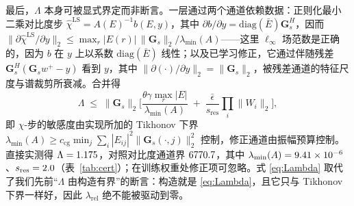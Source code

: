 \documentclass[UTF8,a4paper,11pt]{ctexart}
\newcommand{\norm}[1]{\lVert #1 \rVert}
\newcommand{\numv}[1]{#1}
\begin{document}
最后，$\Lambda$ 本身可被显式界定而非断言。一层通过两个通道依赖数据：正则化最小二乘对比度步
$\hat\chi^{\mathrm{LS}}=A(E)^{-1}b(E,y)$，其中
$\partial b/\partial y=\mathrm{diag}(\bar E)\mathbf{G}_s^{H}$，因而
$\norm{\partial\hat\chi^{\mathrm{LS}}/\partial y}_2
\le\max_r|E(r)|\,\norm{\mathbf{G}_s}_2/\lambda_{\min}(A)$——这里 $\ell_\infty$ 场范数是正确的，因为 $b$ 在 $y$ 上以系数 $\mathrm{diag}(\bar E)$ 线性；以及已学习修正，它通过伴随残差 $\mathbf{G}_s^{H}(\mathbf{G}_s w^{+}-y)$ 看到 $y$，其中 $\norm{\partial(\cdot)/\partial y}_2=\norm{\mathbf{G}_s}_2$，被残差通道的特征尺度与谱裁剪所衰减。合并得
\begin{equation}\label{eq:Lambda}
\Lambda\;\le\;\norm{\mathbf{G}_s}_2
\Big[\frac{\theta\gamma\max_r|E|}{\lambda_{\min}(A)}
\;+\;\frac{\bar\epsilon}{s_{\mathrm{res}}}\prod_i\norm{W_i}_2\Big],
\end{equation}
即 $\chi$-步的敏感度由实现所加的 Tikhonov 下界
$\lambda_{\min}(A)\ge c_{\mathrm{cg}}\min_j\sum_i|E_{ij}|^{2}\norm{\mathbf{G}_s(\cdot,j)}_2^{2}$ 控制，修正通道由振幅预算控制。直接实测得 $\Lambda=\numv{\NumLambdaMeas}$，对照对比度通道界 $\numv{\NumLambdaBound}$，其中 $\lambda_{\min}(A)=\numv{\NumLamMin}$、$s_{\mathrm{res}}=\numv{\NumScaleRes}$（表~\ref{tab:cert}）；在训练权重处修正项可忽略。式 \eqref{eq:Lambda} 取代了我们先前“$\Lambda$ 由构造有界”的断言：构造就是 \eqref{eq:Lambda}，且它只与 Tikhonov 下界一样好，因此 $\lambda_{\mathrm{rel}}$ 绝不能被驱动到零。
\end{document}
